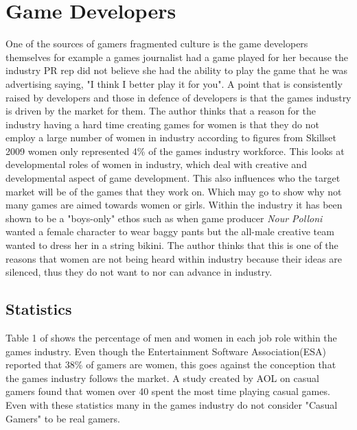 \documentclass[11pt]{scrartcl}
\begin{document}
\section{Game Developers}
One of the sources of gamers fragmented culture is the game developers themselves for example a games journalist had a game played for her because the industry PR rep did not believe she had the ability to play the game that he was advertising saying, "I think I better play it for you"\cite{consalvo2012confronting}. A point that is consistently raised by developers and those in defence of developers is that the games industry is driven by the market for them.\cite{fron2007hegemony} The author thinks that a reason for the industry having a hard time creating games for women is that they do not employ a large number of women in industry according to figures from Skillset 2009 women only represented 4\% of the games industry workforce.\cite{skillset_2009} This looks at developmental roles of women in industry, which deal with creative and developmental aspect of game development. This also influences who the target market will be of the games that they work on.\cite{prescott2011segregation} Which may go to show why not many games are aimed towards women or girls. Within the industry it has been shown to be a "boys-only" ethos such as when game producer \emph{Nour Polloni} wanted a female character to wear baggy pants but the all-male creative team wanted to dress her in a string bikini. The author thinks that this is one of the reasons that women are not being heard within industry because their ideas are silenced, thus they do not want to nor can advance in industry.

\subsection{Statistics}
Table 1 of \cite{prescott2011segregation} shows the percentage of men and women in each job role within the games industry. Even though the Entertainment Software Association(ESA) reported that 38\% of gamers are women, this goes against the conception that the games industry follows the market\cite{fron2007hegemony}. A study created by AOL on casual gamers found that women over 40 spent the most time playing casual games.\cite{pearce2008truth} Even with these statistics many in the games industry do not consider "Casual Gamers" to be real gamers.




\end{document}
